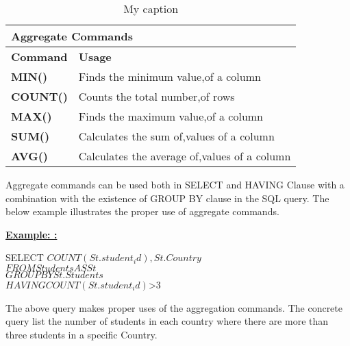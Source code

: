 \begin{table}[h]
\centering
\caption{My caption}
\label{my-label}
\begin{tabular}{|l|l|}
\hline
\multicolumn{2}{|l|}{\textbf{Aggregate Commands}}                                                             \\ \hline
\textbf{Command}                        & \textbf{Usage}                                                      \\ \hline
{\color[HTML]{333333} \textbf{MIN()}}   & {\color[HTML]{333333} Finds the minimum value,of a column}          \\ \hline
{\color[HTML]{333333} \textbf{COUNT()}} & {\color[HTML]{333333} Counts the total number,of rows}              \\ \hline
{\color[HTML]{333333} \textbf{MAX()}}   & {\color[HTML]{333333} Finds the maximum value,of a column}          \\ \hline
{\color[HTML]{333333} \textbf{SUM()}}   & {\color[HTML]{333333} Calculates the sum of,values of a column}     \\ \hline
{\color[HTML]{333333} \textbf{AVG()}}   & {\color[HTML]{333333} Calculates the average of,values of a column} \\ \hline
\end{tabular}
\end{table}


Aggregate commands can be used both in SELECT and HAVING Clause with a combination with the existence of GROUP BY clause in the SQL query. The below example illustrates the proper use of aggregate commands.


\textbf{\underline{Example: :} }
\begin{mdframed}[backgroundcolor=gray!20][h] 
SELECT $COUNT(St.student_id), St.Country$
\\$FROM Students AS St $
\\$GROUP BY St.Students$
\\$HAVING COUNT(St.student_id) $>$  3 $
\end{mdframed}

The above query makes proper uses of the aggregation commands. The concrete query list the number of students in each country where there are more than three students in a specific Country. 

